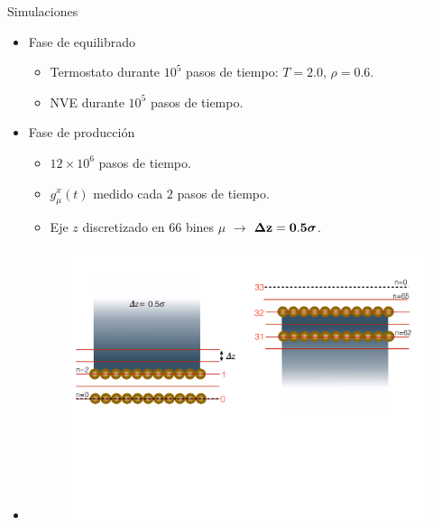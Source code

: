\documentclass{beamer}
\begin{document}
\begin{frame}{Simulaciones}
   \begin{itemize}
     \item<1-> Fase de \alert{equilibrado}
       \begin{itemize}
         \item Termostato durante $10^5$ pasos de tiempo: $T=2.0$, $\rho=0.6$.
         \item NVE durante $10^5$ pasos de tiempo.
          \end{itemize}
        \item<2-> Fase de \alert{producción}
       \begin{itemize}
         \item $12\times10^6$ pasos de tiempo.
         \item $g_{\mu}^x(t)$ medido cada $2$ pasos de tiempo.
         \item Eje $z$ discretizado en $66$ bines $\mu$ $\rightarrow$ {$\boldsymbol{\Delta} {\bf z=0.5}\boldsymbol{\sigma}$}.
         \end{itemize}
       \item<3->[]
         \begin{figure}
    \includegraphics[width=\linewidth]{bin_size_top-bottom}
  \end{figure}
     \end{itemize}

 \end{frame}
\end{document}
